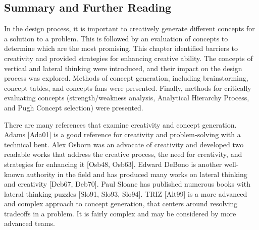 \subsection{Summary and Further
Reading}\label{summary-and-further-reading}

In the design process, it is important to creatively generate different
concepts for a solution to a problem. This is followed by an evaluation
of concepts to determine which are the most promising. This chapter
identified barriers to creativity and provided strategies for enhancing
creative ability. The concepts of vertical and lateral thinking were
introduced, and their im­pact on the design process was explored. Methods
of concept generation, including brainstorming, concept tables, and
concepts fans were presented. Finally, methods for critically evaluating
concepts (strength/weakness analysis, Analytical Hierarchy Process, and
Pugh Concept selection) were presented.

There are many references that examine creativity and concept
generation. Adams {[}Ada01{]} is a good reference for creativity and
problem-solving with a technical bent. Alex Os­born was an advocate of
creativity and developed two readable works that address the creative
process, the need for creativity, and strategies for enhancing it
{[}Osb48, Osb63{]}. Ed­ward DeBono is another well-known authority in the
field and has produced many works on lateral thinking and creativity
{[}Deb67, Deb70{]}. Paul Sloane has published numerous books with
lateral thinking puzzles {[}Slo91, Slo93, Slo94{]}. TRIZ {[}Alt99{]} is
a more advanced and complex approach to concept generation, that centers
around resolving tradeoffs in a problem. It is fairly complex and may be
considered by more advanced teams.
